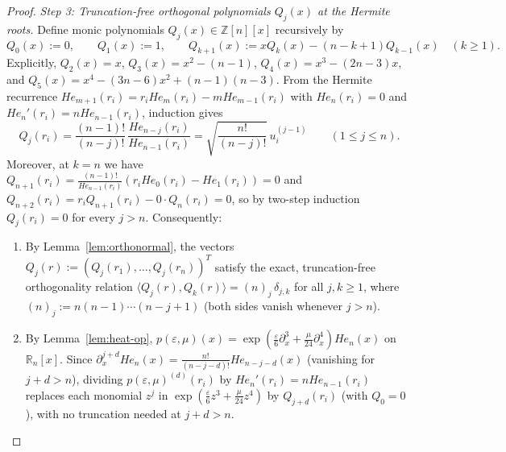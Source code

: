 \documentclass[11pt,a4paper]{article}
\theoremstyle{definition}
\newcommand{\R}{\mathbb{R}}
\begin{document}
\begin{proof}
\emph{Step 3: Truncation-free orthogonal polynomials $Q_j(x)$ at the Hermite roots.}
Define monic polynomials $Q_j(x) \in \mathbb{Z}[n][x]$ recursively by
\[
Q_0(x) := 0, \qquad Q_1(x) := 1, \qquad Q_{k+1}(x) := x Q_k(x) - (n - k + 1) Q_{k-1}(x) \quad (k \ge 1).
\]
Explicitly, $Q_2(x) = x$, $Q_3(x) = x^2 - (n-1)$, $Q_4(x) = x^3 - (2n-3)x$, and $Q_5(x) = x^4 - (3n-6)x^2 + (n-1)(n-3)$. From the Hermite recurrence $He_{m+1}(r_i) = r_i He_m(r_i) - m He_{m-1}(r_i)$ with $He_n(r_i) = 0$ and $He_n'(r_i) = n He_{n-1}(r_i)$, induction gives
\[
Q_j(r_i) = \frac{(n-1)!}{(n-j)!}\,\frac{He_{n-j}(r_i)}{He_{n-1}(r_i)} = \sqrt{\frac{n!}{(n-j)!}}\,u^{(j-1)}_i \qquad (1 \le j \le n).
\]
Moreover, at $k = n$ we have $Q_{n+1}(r_i) = \frac{(n-1)!}{He_{n-1}(r_i)}(r_i He_0(r_i) - He_1(r_i)) = 0$ and $Q_{n+2}(r_i) = r_i Q_{n+1}(r_i) - 0 \cdot Q_n(r_i) = 0$, so by two-step induction $Q_j(r_i) = 0$ for every $j > n$. Consequently:
\begin{enumerate}
\item[(i)] By Lemma~\ref{lem:orthonormal}, the vectors $Q_j(r) := (Q_j(r_1),\dots,Q_j(r_n))^T$ satisfy the exact, truncation-free orthogonality relation $\langle Q_j(r), Q_k(r)\rangle = (n)_j\,\delta_{j,k}$ for all $j, k \ge 1$, where $(n)_j := n(n-1)\cdots(n-j+1)$ (both sides vanish whenever $j > n$).
\item[(ii)] By Lemma~\ref{lem:heat-op}, $p(\varepsilon,\mu)(x) = \exp(\frac{\varepsilon}{6}\partial_x^3 + \frac{\mu}{24}\partial_x^4) He_n(x)$ on $\R_n[x]$. Since $\partial_x^{j+d} He_n(x) = \frac{n!}{(n-j-d)!} He_{n-j-d}(x)$ (vanishing for $j + d > n$), dividing $p(\varepsilon,\mu)^{(d)}(r_i)$ by $He_n'(r_i) = n He_{n-1}(r_i)$ replaces each monomial $z^j$ in $\exp(\frac{\varepsilon}{6}z^3 + \frac{\mu}{24}z^4)$ by $Q_{j+d}(r_i)$ (with $Q_0 = 0$), with no truncation needed at $j + d > n$.
\end{enumerate}


\end{proof}
\end{document}
